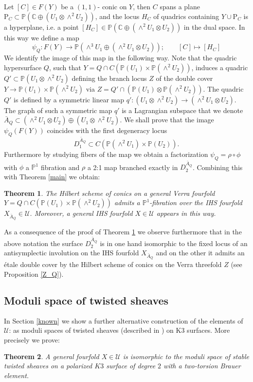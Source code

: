 \documentclass[a4paper,11pt]{amsart}
\newtheorem{thm}{Theorem}[section]
\theoremstyle{definition}
\numberwithin{equation}{section}
\numberwithin{equation}{section} \theoremstyle{definition}
\begin{document}
Let $[C]\in F(Y)$ be a $(1,1)$- conic on $Y$, then $C$ spans a plane ${{\mathrm{P}}}_C\subset {{\mathbb{P}}}({{\mathbb{C}  }}\oplus (U_1\otimes \wedge^2 U_2))$, and the  locus $H_C$ of quadrics containing $Y\cup {{\mathrm{P}}}_C$ is a hyperplane, i.e. a point $[H_C]\in {{\mathbb{P}}}({{\mathbb{C}  }}\oplus (\wedge^2 U_1\otimes  U_2))$ in the dual space. 
In this way we define a map
\[
\psi_{Q}: F(Y)\to {{\mathbb{P}}}(\wedge^3 U_1 \oplus (\wedge^2 U_1 \otimes U_2)); \qquad [C]\mapsto [H_C]
\]
We identify the image of this map in the following way.
Note that  the quadric hypersurface $Q$, such that $Y=Q\cap C({{\mathbb{P}}}( U_1)\times {{\mathbb{P}}}(\wedge^2 U_2))$, induces a quadric $Q'\subset {{\mathbb{P}}}(U_1 \otimes \wedge^2 U_2)$ defining the branch locus $Z$ of the double cover $Y\to {{\mathbb{P}}}(U_1)\times {{\mathbb{P}}}(\wedge^2 U_2)$ via $Z=Q'\cap ({{\mathbb{P}}}( U_1) \otimes {{\mathbb{P}}}(\wedge^2 U_2))$. The quadric $Q'$ is defined by a symmetric linear map $q'\colon ( U_1\otimes \wedge^2 U_2) \to  (\wedge^2 U_1\otimes U_2)$. The graph of such a symmetric map $q'$ is a  Lagrangian subspace that we denote $\bar{A}_Q\subset (\wedge^2 U_1\otimes U_2)\oplus ( U_1\otimes \wedge^2 U_2)$.
We shall prove that the image $\psi_{Q}(F(Y))$ coincides with the first degeneracy locus $$D^{\bar{A}_Q}_1\subset C({{\mathbb{P}}}(\wedge^2 U_1)\times {{\mathbb{P}}}(U_2)).$$
Furthermore by studying fibers of the map we obtain a factorization $\psi_{Q}
= \rho\circ\phi$ with $\phi$ a ${{\mathbb{P}}}^1$ fibration and $\rho$ a 2:1 map branched exactly in $D^{\bar{A}_Q}_2$.
Combining this with Theorem \ref{main} we obtain:
\begin{thm}\label{main2}  The Hilbert scheme of conics on a general Verra fourfold $Y=Q\cap C({{\mathbb{P}}}( U_1)\times {{\mathbb{P}}}(\wedge^2 U_2))$ admits a ${{\mathbb{P}}}^1$-fibration over the IHS fourfold $X_{\bar{A}_Q}\in \mathcal{U}$. Moreover, a general IHS fourfold $X\in \mathcal{U}$ appears in this way.

 \end{thm}
As a consequence of the proof of Theorem \ref{main2} we observe furthermore that in the above notation the surface $D^{\bar{A}_Q}_2$
is in one hand isomorphic to the fixed locus of an antisymplectic involution on the IHS fourfold $X_{\bar{A}_Q}$ and on the other it admits an \'etale double cover by the Hilbert scheme of conics on the Verra threefold $Z$ (see Proposition \ref{Z_Q}).

\subsection{Moduli space of twisted sheaves}
In Section \ref{known} we show a further alternative construction of the elements of $\mathcal{U}$: as moduli spaces of twisted sheaves (described in \cite{Yo}) 
on K3 surfaces. More precisely we prove:
\begin{thm} A general fourfold $X\in \mathcal{U}$  is isomorphic to the moduli space of stable twisted sheaves on a polarized $K3$ surface of degree $2$ with a two-torsion Brauer element. 
\end{thm}
\end{document}
